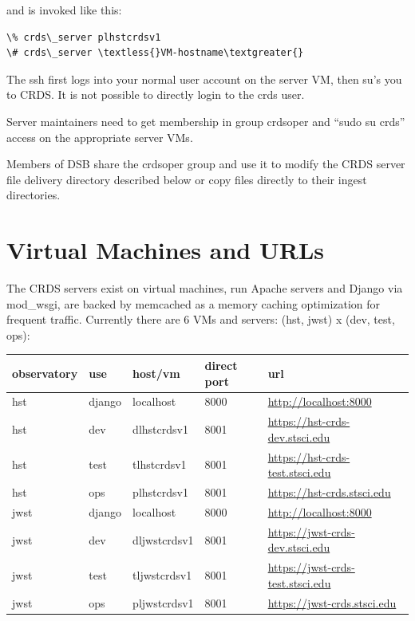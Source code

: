 \documentclass[letterpaper,10pt,english]{sphinxmanual}
\begin{document}
and is invoked like this:

\begin{Verbatim}[commandchars=\\\{\}]
\% crds\_server plhstcrdsv1
\# crds\_server \textless{}VM-hostname\textgreater{}
\end{Verbatim}

The ssh first logs into your normal user account on the server VM, then su's you to CRDS.   It is not possible
to directly login to the crds user.

Server maintainers need to get membership in group crdsoper and ``sudo su crds'' access on
the appropriate server VMs.

Members of DSB share the crdsoper group and use it to modify the CRDS server file delivery
directory described below or copy files directly to their ingest directories.


\section{Virtual Machines and URLs}
\label{server_guide:virtual-machines-and-urls}
The CRDS servers exist on virtual machines,  run Apache servers and Django via mod\_wsgi,
are backed by memcached as a memory caching optimization for frequent traffic.  Currently
there are 6 VMs and servers:  (hst, jwst) x (dev, test, ops):

\begin{tabulary}{\linewidth}{|L|L|L|L|L|}
\hline
\textbf{
observatory
} & \textbf{
use
} & \textbf{
host/vm
} & \textbf{
direct port
} & \textbf{
url
}\\\hline

hst
 & 
django
 & 
localhost
 & 
8000
 & 
\href{http://localhost:8000}{http://localhost:8000}
\\\hline

hst
 & 
dev
 & 
dlhstcrdsv1
 & 
8001
 & 
\href{https://hst-crds-dev.stsci.edu}{https://hst-crds-dev.stsci.edu}
\\\hline

hst
 & 
test
 & 
tlhstcrdsv1
 & 
8001
 & 
\href{https://hst-crds-test.stsci.edu}{https://hst-crds-test.stsci.edu}
\\\hline

hst
 & 
ops
 & 
plhstcrdsv1
 & 
8001
 & 
\href{https://hst-crds.stsci.edu}{https://hst-crds.stsci.edu}
\\\hline

jwst
 & 
django
 & 
localhost
 & 
8000
 & 
\href{http://localhost:8000}{http://localhost:8000}
\\\hline

jwst
 & 
dev
 & 
dljwstcrdsv1
 & 
8001
 & 
\href{https://jwst-crds-dev.stsci.edu}{https://jwst-crds-dev.stsci.edu}
\\\hline

jwst
 & 
test
 & 
tljwstcrdsv1
 & 
8001
 & 
\href{https://jwst-crds-test.stsci.edu}{https://jwst-crds-test.stsci.edu}
\\\hline

jwst
 & 
ops
 & 
pljwstcrdsv1
 & 
8001
 & 
\href{https://jwst-crds.stsci.edu}{https://jwst-crds.stsci.edu}
\\\hline
\end{tabulary}
\end{document}
